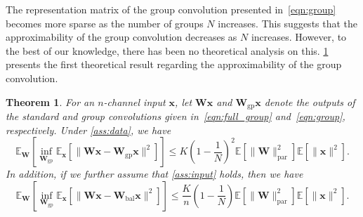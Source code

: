 \documentclass[10pt,a4paper]{amsart}
\numberwithin{equation}{section}
\newtheorem{theorem}{Theorem}[section]
\theoremstyle{remark}
\newcommand\bW{\mathbf{W}}
\newcommand\bx{\mathbf{x}}
\newcommand\bbE{\mathbb{E}}
\newcommand\gp{\mathrm{gp}}
\newcommand\bal{\mathrm{bal}}
\newcommand\param{\mathrm{par}}
\begin{document}
The representation matrix of the group convolution presented in~\eqref{eqn:group} becomes more sparse as the number of groups $N$ increases.
This suggests that the approximability of the group convolution decreases as $N$ increases.
However, to the best of our knowledge, there has been no theoretical analysis on this.
\cref{thm:1} presents the first theoretical result regarding the approximability of the group convolution.


\begin{theorem}
  \label{thm:1}
  For an $n$-channel input $\bx$, let $\bW \bx$ and $\bW_{\gp} \bx$ denote the outputs of the standard and group convolutions given in~\eqref{eqn:full_group} and~\eqref{eqn:group}, respectively.
  Under \cref{ass:data}, we have
  \begin{equation*}
  \bbE_{\bW} \left[ \inf_{\bW_{\gp}} \bbE_{\bx} \left[ \| \bW \bx - \bW_{\gp} \bx \|^2 \right] \right]
  \leq K \left( 1 - \frac{1}{N} \right)^2 \bbE \left[ \| \bW \|_{\param}^2 \right] \bbE \left[ \| \bx \|^2 \right].
  \end{equation*}
  In addition, if we further assume that \cref{ass:input} holds, then we have
  \begin{equation*}
  \bbE_{\bW} \left[ \inf_{\bW_{\gp}} \bbE_{\bx} \left[ \| \bW \bx - \bW_{\bal} \bx \|^2 \right] \right]
  \leq \frac{K}{n} \left( 1 - \frac{1}{N} \right) \bbE \left[ \| \bW \|_{\param}^2 \right] \bbE \left[ \| \bx \|^2 \right].
  \end{equation*}
\end{theorem}
\end{document}
